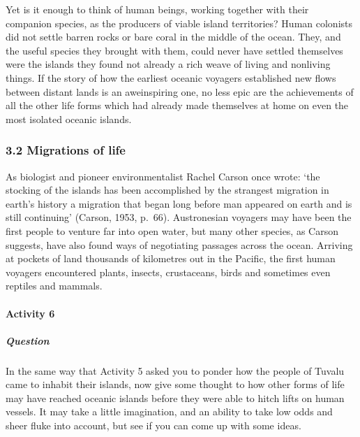 \documentclass[letterpaper,10pt,english]{sphinxmanual}
\begin{document}
Yet is it enough to think of human beings, working together with their companion species, as the producers of viable island territories? Human colonists did not settle barren rocks or bare coral in the middle of the ocean. They, and the useful species they brought with them, could never have settled themselves were the islands they found not already a rich weave of living and non\sphinxhyphen{}living things. If the story of how the earliest oceanic voyagers established new flows between distant lands is an
awe\sphinxhyphen{}inspiring one, no less epic are the achievements of all the other life forms which had already made themselves at home on even the most isolated oceanic islands.


\subsubsection{3.2 Migrations of life}
\label{\detokenize{content/session_00/Part_00_03:3.2-Migrations-of-life}}
As biologist and pioneer environmentalist Rachel Carson once wrote: ‘the stocking of the islands has been accomplished by the strangest migration in earth’s history \textendash{} a migration that began long before man appeared on earth and is still continuing’ (Carson, 1953, p. 66). Austronesian voyagers may have been the first people to venture far into open water, but many other species, as Carson suggests, have also found ways of negotiating passages across the ocean. Arriving at pockets of land
thousands of kilometres out in the Pacific, the first human voyagers encountered plants, insects, crustaceans, birds and sometimes even reptiles and mammals.


\paragraph{Activity 6}
\label{\detokenize{content/session_00/Part_00_03:Activity-6}}

\subparagraph{Question}
\label{\detokenize{content/session_00/Part_00_03:id1}}
In the same way that Activity 5 asked you to ponder how the people of Tuvalu came to inhabit their islands, now give some thought to how other forms of life may have reached oceanic islands before they were able to hitch lifts on human vessels. It may take a little imagination, and an ability to take low odds and sheer fluke into account, but see if you can come up with some ideas.
\end{document}
